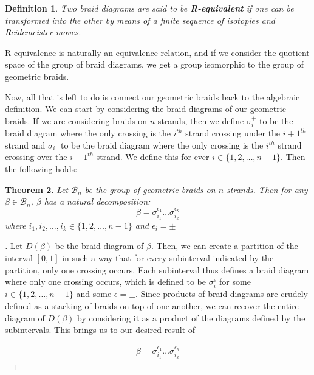 \documentclass[10pt]{ucthesis}
\newtheorem{definition}{Definition}[chapter]
\newtheorem{theorem}[definition]{Theorem}
\begin{document}
\begin{definition}
	Two braid diagrams are said to be \textbf{R-equivalent} if one can be transformed into the other by means of a finite sequence of isotopies and Reidemeister moves.
\end{definition}

R-equivalence is naturally an equivalence relation, and if we consider the quotient space of the group of braid diagrams, we get a group isomorphic to the group of geometric braids.

Now, all that is left to do is connect our geometric braids back to the algebraic definition. We can start by considering the braid diagrams of our geometric braids. If we are considering braids on $n$ strands, then we define $\sigma_i^+$ to be the braid diagram where the only crossing is the $i^{th}$ strand crossing under the $i+1^{th}$ strand and $\sigma_i^-$ to be the braid diagram where the only crossing is the $i^{th}$ strand crossing over the $i+1^{th}$ strand. We define this for ever $i\in\{1,2,\hdots,n-1\}$. Then the following holds:

\begin{theorem}
	Let $\mathcal{B}_n$ be the group of geometric braids on $n$ strands. Then for any $\beta\in\mathcal{B}_n$, $\beta$ has a natural decomposition:
$$\beta = \sigma^{\epsilon_1}_{i_1}\hdots\sigma^{\epsilon_k}_{i_k}$$ 
where $i_1,i_2,\hdots,i_k\in\{1,2,\hdots,n-1\}$ and $\epsilon_i = \pm$
\end{theorem}

\noindent \begin{proof}[\cite{Kassel}] Let $D(\beta)$ be the braid diagram of $\beta$. Then, we can create a partition of the interval $[0,1]$ in such a way that for every subinterval indicated by the partition, only one crossing occurs. Each subinterval thus defines a braid diagram where only one crossing occurs, which is defined to be $\sigma_i^\epsilon$ for some $i\in\{1,2,\hdots,n-1\}$ and some $\epsilon = \pm$. Since products of braid diagrams are crudely defined as a stacking of braids on top of one another, we can recover the entire diagram of $D(\beta)$ by considering it as a product of the diagrams defined by the subintervals. This brings us to our desired result of 

\begin{equation}
\begin{aligned}
\beta = \sigma^{\epsilon_1}_{i_1}\hdots\sigma^{\epsilon_k}_{i_k}  
\end{aligned}
\end{equation}
\end{proof}
\end{document}
